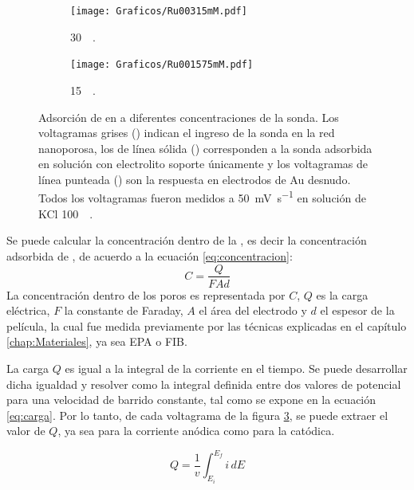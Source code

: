 \begin{figure}[h!]
\begin{subfigure}[t]{0.325\textwidth}
			        	\texttt{[image: Graficos/Ru00315mM.pdf]}
			       		\vspace*{-0.40cm}\caption{\aminorutenio\space \SI{30}{\micro\Molar}.}
			         	\label{fig:Ru00315mM}
			     		\end{subfigure}
		     		\begin{subfigure}[t]{0.325\textwidth}
			        	\texttt{[image: Graficos/Ru001575mM.pdf]}
			       		\vspace*{-0.40cm}\caption{\aminorutenio\space \SI{15}{\micro\Molar}.}
			         	\label{fig:Ru001575mM}
			     		\end{subfigure}	
		 	   	   	\caption[Preconcentración de \aminorutenio\space en \pdmF]{Adsorción de \ru\space en \pdm\space a diferentes concentraciones de la sonda. Los voltagramas grises (\usebox{\gris}) indican el ingreso de la sonda en la red nanoporosa, los de línea sólida (\usebox{\negro}) corresponden a la sonda adsorbida en solución con electrolito soporte únicamente y los voltagramas de línea punteada (\usebox{\punteado}) son la respuesta en electrodos de Au desnudo. Todos los voltagramas fueron medidos a \SI{50}{\milli\volt\per\second} en solución de KCl \SI{100}{\milli\Molar}.}
		     		\label{fig:preconcentraciones}
		     		\vspace*{0.40cm}
		     	   	\end{figure} 

		Se puede calcular la concentración dentro de la \pdm, es decir la concentración adsorbida de \ru, de acuerdo a la ecuación \ref{eq:concentracion}:
				\begin{equation}
					C=\frac{Q}{FAd}
					\label{eq:concentracion}
					\end{equation}
		La concentración dentro de los poros es representada por $C$, $Q$ es la carga eléctrica, $F$ la constante de Faraday, $A$ el área del electrodo y $d$ el espesor de la película, la cual fue medida previamente por las técnicas explicadas en el capítulo \ref{chap:Materiales}, ya sea EPA o FIB.

		La carga $Q$ es igual a la integral de la corriente en el tiempo. Se puede desarrollar dicha igualdad y resolver como la integral definida entre dos valores de potencial para una velocidad de barrido constante, tal como se expone en la ecuación \ref{eq:carga}. Por lo tanto, de cada voltagrama de la figura \ref{fig:preconcentraciones}, se puede extraer el valor de $Q$, ya sea para la corriente anódica como para la catódica.
		
			\begin{equation}
					Q=\frac{1}{v}\int_{E_{i}}^{E_{f}} i\,dE
					\label{eq:carga}
			\end{equation}
	
